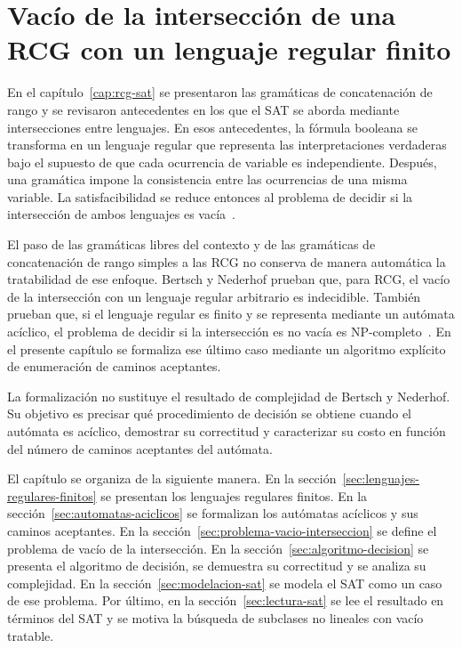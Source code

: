 \documentclass{report}
\theoremstyle{definition}
\theoremstyle{plain}
\theoremstyle{remark}
\begin{document}
\setcounter{chapter}{2}
\chapter{Vacío de la intersección de una RCG con un lenguaje regular finito}
\label{cap:vacio-interseccion-rcg-regular}

En el capítulo~\ref{cap:rcg-sat} se presentaron las gramáticas de
concatenación de rango y se revisaron antecedentes en los que el SAT se
aborda mediante intersecciones entre lenguajes. En esos antecedentes, la
fórmula booleana se transforma en un lenguaje regular que representa las
interpretaciones verdaderas bajo el supuesto de que cada ocurrencia de
variable es independiente. Después, una gramática impone la consistencia
entre las ocurrencias de una misma variable. La satisfacibilidad se
reduce entonces al problema de decidir si la intersección de ambos
lenguajes es vacía~\cite{fernandezarias2007,aguileralopez2016}.

El paso de las gramáticas libres del contexto y de las gramáticas de
concatenación de rango simples a las RCG no conserva de manera
automática la tratabilidad de ese enfoque. Bertsch y Nederhof prueban
que, para RCG, el vacío de la intersección con un lenguaje
regular arbitrario es indecidible. También prueban que, si el lenguaje
regular es finito y se representa mediante un autómata acíclico, el
problema de decidir si la intersección es no vacía es
NP-completo~\cite{bertsch2001rcg}. En el presente capítulo se formaliza
ese último caso mediante un algoritmo explícito de enumeración de
caminos aceptantes.

La formalización no sustituye el resultado de complejidad de
Bertsch y Nederhof. Su objetivo es precisar qué procedimiento de decisión
se obtiene cuando el autómata es acíclico, demostrar su correctitud y
caracterizar su costo en función del número de caminos aceptantes del
autómata.

El capítulo se organiza de la siguiente manera. En la
sección~\ref{sec:lenguajes-regulares-finitos} se presentan los lenguajes
regulares finitos. En la sección~\ref{sec:automatas-aciclicos} se
formalizan los autómatas acíclicos y sus caminos aceptantes. En la
sección~\ref{sec:problema-vacio-interseccion} se define el problema de
vacío de la intersección. En la sección~\ref{sec:algoritmo-decision} se
presenta el algoritmo de decisión, se demuestra su correctitud y se
analiza su complejidad. En la
sección~\ref{sec:modelacion-sat} se modela el SAT como un caso de ese
problema. Por último, en la sección~\ref{sec:lectura-sat} se lee el
resultado en términos del SAT y se motiva la búsqueda de subclases no
lineales con vacío tratable.
\end{document}
